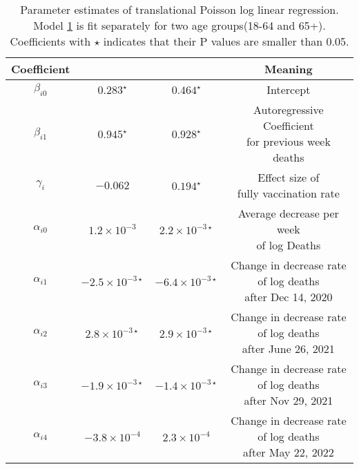 \documentclass[12pt]{article}
\begin{document}
\begin{enumerate}[(a)]
\begin{table}[htbp]
		\centering
		\begin{tabular}{cccc}
			\toprule
			Coefficient & \makecell{18-64 Age Group($i=0$)} & \makecell{65+ Age Group($i=1$)} &  Meaning\\
			\midrule
			$\beta_{i0}$ & $0.283^\star$ & $0.464^\star$ & Intercept\\
			\addlinespace[0.2cm]
			$\beta_{i1}$ & $0.945^\star$ & $0.928^\star$ &  \makecell{Autoregressive Coefficient \\ for previous week deaths}\\
			\addlinespace[0.2cm]
			$\gamma_{i}$ & $-0.062$ & $0.194^\star$ &  \makecell{Effect size of \\fully vaccination rate}\\
			\addlinespace[0.2cm] 
			$\alpha_{i0}$ & $1.2\times 10^{-3}$ & $2.2\times 10^{-3\star}$ &   \makecell{Average decrease per week \\ of log Deaths}\\
			\addlinespace[0.2cm]
			$\alpha_{i1}$ & $-2.5\times 10^{-3\star}$ & $-6.4\times 10^{-3\star}$ &  \makecell{Change in decrease rate \\ of log deaths\\ after Dec 14, 2020}\\
			\addlinespace[0.2cm]
			$\alpha_{i2}$ & $2.8\times 10^{-3\star}$ & $2.9\times 10^{-3\star}$ &  \makecell{Change in decrease rate \\ of log deaths\\ after June 26, 2021}\\
			\addlinespace[0.2cm]
			$\alpha_{i3}$ & $-1.9\times 10^{-3\star}$ & $-1.4\times 10^{-3\star}$ & \makecell{Change in decrease rate \\ of log deaths\\ after Nov 29, 2021}\\
			\addlinespace[0.2cm]
			$\alpha_{i4}$ & $-3.8\times 10^{-4}$ & $2.3\times 10^{-4}$ &  \makecell{Change in decrease rate \\ of log deaths \\ after May 22, 2022}\\
			
			\bottomrule
		\end{tabular}
		\caption{Parameter estimates of translational Poisson log linear regression. Model \ref{P3a} is fit separately for two age groups(18-64 and 65+). Coefficients with $\star$ indicates that their P values are smaller than 0.05. }\label{P3a}
\end{table}


\end{enumerate}
\end{document}
